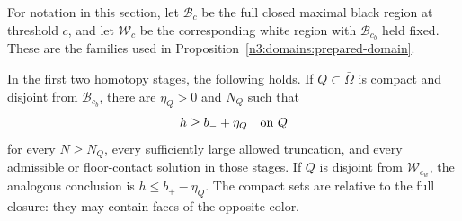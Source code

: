For notation in this section, let $\mathcal B_c$ be the full closed
maximal black region at threshold $c$, and let $\mathcal W_c$ be the
corresponding white region with $\mathcal B_{c_b}$ held fixed.  These
are the families used in Proposition~\ref{n3:domains:prepared-domain}.

\begin{lemma}
\label{n3:apriori:sublevels}
In the first two homotopy stages, the following holds.  If
$Q\subset\bar\Omega$ is compact and disjoint from $\mathcal B_{c_b}$,
there are $\eta_Q>0$ and $N_Q$ such that
\begin{equation}
 h\ge b_-+\eta_Q\quad\hbox{on }Q
 \label{n3:apriori:lower-height}
\end{equation}
for every $N\ge N_Q$, every sufficiently large allowed truncation,
and every admissible or floor-contact solution in those stages.
If $Q$ is disjoint from $\mathcal W_{c_w}$, the analogous conclusion is
$h\le b_+-\eta_Q$.  The compact sets are relative to the full closure:
they may contain faces of the opposite color.
\end{lemma}

